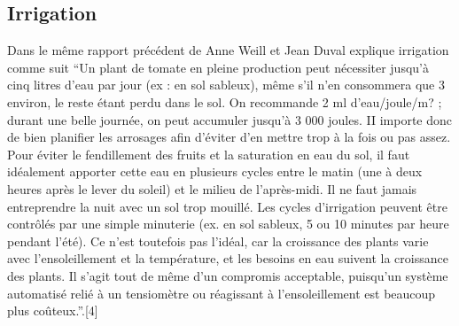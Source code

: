 \subsection{Irrigation}
Dans le même rapport précédent de Anne Weill et Jean Duval explique irrigation comme suit 
“Un plant de tomate en pleine production peut nécessiter jusqu'à cinq litres d'eau par jour (ex : en sol sableux), même s'il n'en consommera que 3 environ, le reste étant perdu dans le sol. On recommande 2 ml d'eau/joule/m? ; durant une belle journée, on peut accumuler jusqu'à 3 000 joules. II importe donc de bien planifier les arrosages afin d'éviter d'en mettre trop à la fois ou pas assez.
Pour éviter le fendillement des fruits et la saturation en eau du sol, il faut idéalement apporter cette eau en plusieurs cycles entre le matin (une à deux heures après le lever du soleil) et le milieu de l'après-midi. Il ne faut jamais entreprendre la nuit avec un sol trop mouillé. Les cycles d'irrigation peuvent être contrôlés par une simple minuterie (ex. en sol sableux, 5 ou 10 minutes par heure pendant l'été). Ce n'est toutefois pas l'idéal, car la croissance des plants varie avec l'ensoleillement et la température, et les besoins en eau suivent la croissance des plants. Il s'agit tout de même d'un compromis acceptable, puisqu'un système automatisé relié à un tensiomètre ou réagissant à l'ensoleillement est beaucoup plus coûteux.”.[4]